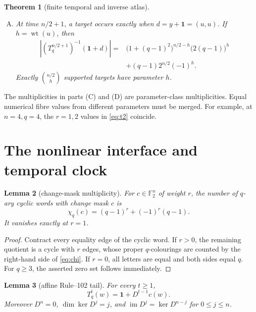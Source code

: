 \documentclass[a4paper,10pt]{amsart}
\newtheorem{theorem}{Theorem}
\newtheorem{lemma}[theorem]{Lemma}
\theoremstyle{remark}
\newcommand{\F}{\mathbb F}
\newcommand{\one}{\boldsymbol 1}
\newcommand{\wt}{\operatorname{wt}}
\newcommand{\im}{\operatorname{im}}
\begin{document}
\begin{theorem}[finite temporal and inverse atlas]
\begin{enumerate}[(A)]
\item At time $n/2+1$, a target occurs exactly when
$d=y+\one=(u,u)$.  If $h=\wt(u)$, then
\begin{equation}\label{eq:mid}
\begin{split}
 |(T_q^{n/2+1})^{-1}(\one+d)|={}&
 \bigl(1+(q-1)^2\bigr)^{n/2-h}\bigl(2(q-1)\bigr)^h\\
 &+(q-1)2^{n/2}(-1)^h.
\end{split}
\end{equation}
Exactly $\binom{n/2}{h}$ supported targets have parameter $h$.
\end{enumerate}
\end{theorem}

The multiplicities in parts (C) and (D) are parameter-class
multiplicities.  Equal numerical fibre values from different parameters must
be merged.  For example, at $n=4,q=4$, the $r=1,2$ values in
\eqref{eq:t2} coincide.

\section{The nonlinear interface and temporal clock}

\begin{lemma}[change-mask multiplicity]\label{lem:chi}
For $c\in\F_2^n$ of weight $r$, the number of $q$-ary cyclic words with
change mask $c$ is
\begin{equation}\label{eq:chi}
 \chi_q(c)=(q-1)^r+(-1)^r(q-1).
\end{equation}
It vanishes exactly at $r=1$.
\end{lemma}

\begin{proof}
Contract every equality edge of the cyclic word.  If $r>0$, the remaining
quotient is a cycle with $r$ edges, whose proper $q$-colourings are counted
by the right-hand side of \eqref{eq:chi}.  If $r=0$, all letters are equal
and both sides equal $q$.  For $q\geq3$, the asserted zero set follows
immediately.
\end{proof}

\begin{lemma}[affine Rule--102 tail]\label{lem:tail}
For every $t\geq1$,
\begin{equation}\label{eq:iterate}
 T_q^t(w)=\one+D^{t-1}c(w).
\end{equation}
Moreover $D^n=0$, $\dim\ker D^j=j$, and
$\im D^j=\ker D^{n-j}$ for $0\leq j\leq n$.
\end{lemma}
\end{document}
